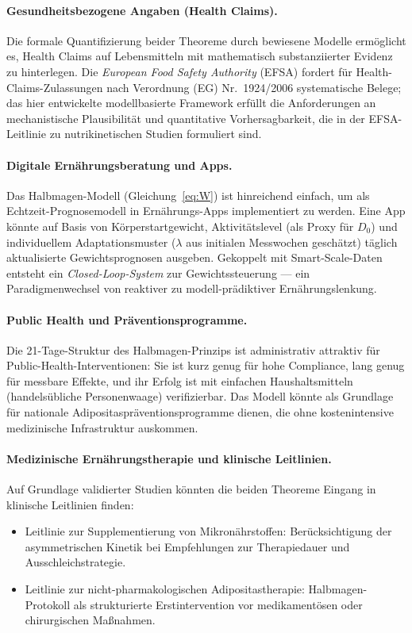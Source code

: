 ﻿\documentclass[12pt,a4paper]{article}
\theoremstyle{plain}
\theoremstyle{definition}
\theoremstyle{remark}
\begin{document}
\paragraph{Gesundheitsbezogene Angaben (Health Claims).}
Die formale Quantifizierung beider Theoreme durch bewiesene Modelle
ermöglicht es, Health Claims auf Lebensmitteln mit mathematisch
substanziierter Evidenz zu hinterlegen. Die \textit{European Food Safety
Authority} (EFSA) fordert für Health-Claims-Zulassungen nach Verordnung
(EG) Nr.~1924/2006 systematische Belege; das hier entwickelte
modellbasierte Framework erfüllt die Anforderungen an mechanistische
Plausibilität und quantitative Vorhersagbarkeit, die in der
EFSA-Leitlinie zu nutrikinetischen Studien formuliert sind.

\paragraph{Digitale Ernährungsberatung und Apps.}
Das Halbmagen-Modell (Gleichung~\eqref{eq:W}) ist hinreichend einfach, um
als Echtzeit-Prognosemodell in Ernährungs-Apps implementiert zu werden.
Eine App könnte auf Basis von Körperstartgewicht, Aktivitätslevel (als
Proxy für $D_0$) und individuellem Adaptationsmuster ($\lambda$ aus
initialen Messwochen geschätzt) täglich aktualisierte Gewichtsprognosen
ausgeben. Gekoppelt mit Smart-Scale-Daten entsteht ein
\emph{Closed-Loop-System} zur Gewichtssteuerung --- ein Paradigmenwechsel
von reaktiver zu modell-prädiktiver Ernährungslenkung.

\paragraph{Public Health und Präventionsprogramme.}
Die 21-Tage-Struktur des Halbmagen-Prinzips ist administrativ attraktiv
für Public-Health-Interventionen: Sie ist kurz genug für hohe Compliance,
lang genug für messbare Effekte, und ihr Erfolg ist mit einfachen
Haushaltsmitteln (handelsübliche Personenwaage) verifizierbar. Das Modell
könnte als Grundlage für nationale Adipositaspräventionsprogramme dienen,
die ohne kostenintensive medizinische Infrastruktur auskommen.

\paragraph{Medizinische Ernährungstherapie und klinische Leitlinien.}
Auf Grundlage validierter Studien könnten die beiden Theoreme Eingang in
klinische Leitlinien finden:
\begin{itemize}
  \item Leitlinie zur Supplementierung von Mikronährstoffen:
        Berücksichtigung der asymmetrischen Kinetik bei Empfehlungen
        zur Therapiedauer und Ausschleichstrategie.
  \item Leitlinie zur nicht-pharmakologischen Adipositastherapie:
        Halbmagen-Protokoll als strukturierte Erstintervention vor
        medikamentösen oder chirurgischen Maßnahmen.
\end{itemize}
\end{document}
